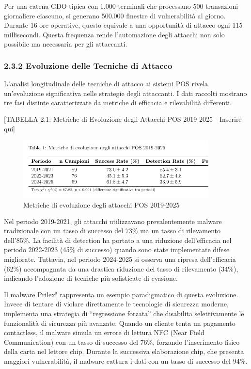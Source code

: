 \documentclass{report}
\begin{document}
Per una catena GDO tipica con 1.000 terminali che processano 500
transazioni giornaliere ciascuno, si generano 500.000 finestre di
vulnerabilità al giorno. Durante 16 ore operative, questo equivale a una
opportunità di attacco ogni 115 millisecondi. Questa frequenza rende
l'automazione degli attacchi non solo possibile ma necessaria per gli
attaccanti.

\subsubsection{2.3.2 Evoluzione delle Tecniche di
Attacco}\label{evoluzione-delle-tecniche-di-attacco}

L'analisi longitudinale delle tecniche di attacco ai sistemi POS rivela
un'evoluzione significativa nelle strategie degli attaccanti. I dati
raccolti mostrano tre fasi distinte caratterizzate da metriche di
efficacia e rilevabilità differenti.

{[}TABELLA 2.1: Metriche di Evoluzione degli Attacchi POS 2019-2025 -
Inserire qui{]}

\begin{figure}[htbp]
    \centering
    \includegraphics[width=0.9\textwidth]{tabella 2-1}
    \caption{Metriche di evoluzione degli attacchi POS 2019-2025}
    \label{tab:evoluzione_attacchi}
\end{figure}


Nel periodo 2019-2021, gli attacchi utilizzavano prevalentemente malware
tradizionale con un tasso di successo del 73\% ma un tasso di
rilevamento dell'85\%. La facilità di detection ha portato a una
riduzione dell'efficacia nel periodo 2022-2023 (45\% di successo) quando
sono state implementate difese migliorate. Tuttavia, nel periodo
2024-2025 si osserva una ripresa dell'efficacia (62\%) accompagnata da
una drastica riduzione del tasso di rilevamento (34\%), indicando
l'adozione di tecniche più sofisticate di evasione.

Il malware Prilex⁵ rappresenta un esempio paradigmatico di questa
evoluzione. Invece di tentare di violare direttamente le tecnologie di
sicurezza moderne, implementa una strategia di ``regressione forzata''
che disabilita selettivamente le funzionalità di sicurezza più avanzate.
Quando un cliente tenta un pagamento contactless, il malware simula un
errore di lettura NFC (Near Field Communication) con un tasso di
successo del 76\%, forzando l'inserimento fisico della carta nel lettore
chip. Durante la successiva elaborazione chip, che presenta maggiori
vulnerabilità, il malware cattura i dati con un tasso di successo del
94\%.
\end{document}
